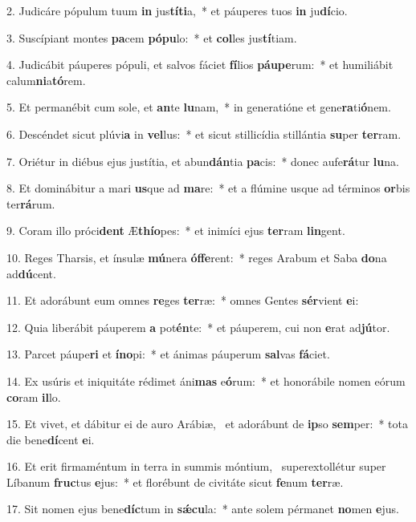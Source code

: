 2. Judicáre pópulum tuum \textbf{in} jus\textbf{tí}\textbf{ti}a,~*  et páuperes tuos \textbf{in} ju\textbf{dí}cio.\

3. Suscípiant montes \textbf{pa}cem \textbf{pó}\textbf{pu}lo:~*  et \textbf{col}les jus\textbf{tí}tiam.\

4. Judicábit páuperes pópuli, et salvos fáciet \textbf{fí}lios \textbf{páu}\textbf{pe}rum:~*  et humiliábit calum\textbf{ni}a\textbf{tó}rem.\

5. Et permanébit cum sole, et \textbf{an}te \textbf{lu}nam,~*  in generatióne et gene\textbf{ra}ti\textbf{ó}nem.\

6. Descéndet sicut plúvi\textbf{a} in \textbf{vel}lus:~*  et sicut stillicídia stillántia \textbf{su}per \textbf{ter}ram.\

7. Oriétur in diébus ejus justítia, et abun\textbf{dán}tia \textbf{pa}cis:~*  donec aufe\textbf{rá}tur \textbf{lu}na.\

8. Et dominábitur a mari \textbf{us}que ad \textbf{ma}re:~*  et a flúmine usque ad términos \textbf{or}bis ter\textbf{rá}rum.\

9. Coram illo próci\textbf{dent} Æ\textbf{thí}\textbf{o}pes:~*  et inimíci ejus \textbf{ter}ram \textbf{lin}gent.\

10. Reges Tharsis, et ínsulæ \textbf{mú}nera \textbf{óf}\textbf{fe}rent:~*  reges Arabum et Saba \textbf{do}na ad\textbf{dú}cent.\

11. Et adorábunt eum omnes \textbf{re}ges \textbf{ter}ræ:~*  omnes Gentes \textbf{sér}vient \textbf{e}i:\

12. Quia liberábit páuperem \textbf{a} pot\textbf{én}te:~*  et páuperem, cui non \textbf{e}rat ad\textbf{jú}tor.\

13. Parcet páupe\textbf{ri} et \textbf{ín}\textbf{o}pi:~*  et ánimas páuperum \textbf{sal}vas \textbf{fá}ciet.\

14. Ex usúris et iniquitáte rédimet áni\textbf{mas} e\textbf{ó}rum:~*  et honorábile nomen eórum \textbf{co}ram \textbf{il}lo.\

15. Et vivet, et dábitur ei de auro Arábiæ, \dag\  et adorábunt de \textbf{ip}so \textbf{sem}per:~*  tota die bene\textbf{dí}cent \textbf{e}i.\

16. Et erit firmaméntum in terra in summis móntium, \dag\  superextollétur super Líbanum \textbf{fruc}tus \textbf{e}jus:~*  et florébunt de civitáte sicut \textbf{fe}num \textbf{ter}ræ.\

17. Sit nomen ejus bene\textbf{díc}tum in \textbf{sǽ}\textbf{cu}la:~*  ante solem pérmanet \textbf{no}men \textbf{e}jus.\

